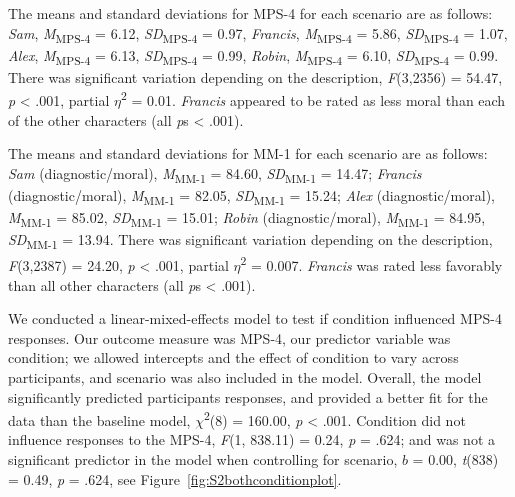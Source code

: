 \documentclass[
  man,floatsintext]{apa6}
\begin{document}
The means and standard deviations for MPS-4 for each scenario are as follows:
\emph{Sam},
\emph{M}\textsubscript{MPS-4} = 6.12, \emph{SD}\textsubscript{MPS-4} = 0.97,
\emph{Francis},
\emph{M}\textsubscript{MPS-4} = 5.86, \emph{SD}\textsubscript{MPS-4} = 1.07,
\emph{Alex},
\emph{M}\textsubscript{MPS-4} = 6.13, \emph{SD}\textsubscript{MPS-4} = 0.99,
\emph{Robin},
\emph{M}\textsubscript{MPS-4} = 6.10, \emph{SD}\textsubscript{MPS-4} = 0.99. There was significant variation depending on the description, \emph{F}(3,2356) = 54.47, \emph{p} \textless{} .001, partial \(\eta\)\textsuperscript{2} = 0.01. \emph{Francis} appeared to be rated as less moral than each of the other characters (all \emph{p}s \textless{} .001).

The means and standard deviations for MM-1 for each scenario are as follows:
\emph{Sam} (diagnostic/moral),
\emph{M}\textsubscript{MM-1} = 84.60, \emph{SD}\textsubscript{MM-1} = 14.47;
\emph{Francis} (diagnostic/moral),
\emph{M}\textsubscript{MM-1} = 82.05, \emph{SD}\textsubscript{MM-1} = 15.24;
\emph{Alex} (diagnostic/moral),
\emph{M}\textsubscript{MM-1} = 85.02, \emph{SD}\textsubscript{MM-1} = 15.01;
\emph{Robin} (diagnostic/moral),
\emph{M}\textsubscript{MM-1} = 84.95, \emph{SD}\textsubscript{MM-1} = 13.94. There was significant variation depending on the description, \emph{F}(3,2387) = 24.20, \emph{p} \textless{} .001, partial \(\eta\)\textsuperscript{2} = 0.007. \emph{Francis} was rated less favorably than all other characters (all \emph{p}s \textless{} .001).

We conducted a linear-mixed-effects model to test if condition influenced MPS-4 responses. Our outcome measure was MPS-4, our predictor variable was condition; we allowed intercepts and the effect of condition to vary across participants, and scenario was also included in the model.
Overall, the model significantly predicted participants responses, and provided a better fit for the data than the baseline model, \(\chi\)\textsuperscript{2}(8) = 160.00, \emph{p} \textless{} .001. Condition did not influence responses to the MPS-4, \emph{F}(1, 838.11) = 0.24, \emph{p} = .624; and was not a significant predictor in the model when controlling for scenario, \(b\) = 0.00, \emph{t}(838) = 0.49, \emph{p} = .624, see Figure~\ref{fig:S2bothconditionplot}.
\end{document}
